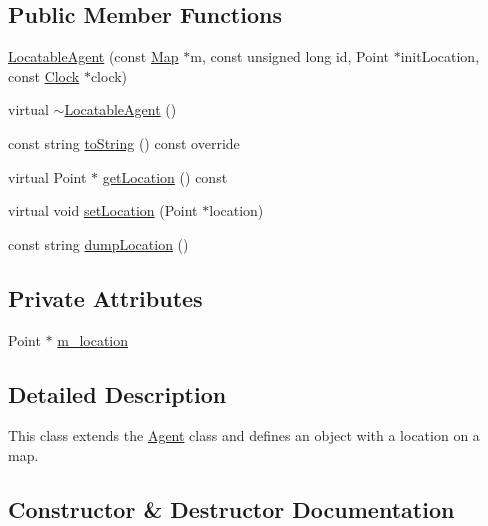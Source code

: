 \subsection*{Public Member Functions}
\begin{DoxyCompactItemize}
\item 
\hyperlink{class_locatable_agent_ab4939cf1ef1352acdac76736bfe47fc7}{Locatable\+Agent} (const \hyperlink{class_map}{Map} $\ast$m, const unsigned long id, Point $\ast$init\+Location, const \hyperlink{class_clock}{Clock} $\ast$clock)
\item 
virtual \hyperlink{class_locatable_agent_ad721398f0b4e841aad377cd91a7f5e3a}{$\sim$\+Locatable\+Agent} ()
\item 
const string \hyperlink{class_locatable_agent_a88674f4c8ab9b1b2f3986b226bf4244f}{to\+String} () const override
\item 
virtual Point $\ast$ \hyperlink{class_locatable_agent_ad779af171c67ce0d478fc79b904e2d90}{get\+Location} () const
\item 
virtual void \hyperlink{class_locatable_agent_a754b237c404b77714fedd397f214bc02}{set\+Location} (Point $\ast$location)
\item 
const string \hyperlink{class_locatable_agent_af9a6dbd25b47c23a71c95b205da3a28d}{dump\+Location} ()
\end{DoxyCompactItemize}
\subsection*{Private Attributes}
\begin{DoxyCompactItemize}
\item 
Point $\ast$ \hyperlink{class_locatable_agent_a2a76ba315733ab26f19229a71071704d}{m\+\_\+location}
\end{DoxyCompactItemize}


\subsection{Detailed Description}
This class extends the \hyperlink{class_agent}{Agent} class and defines an object with a location on a map. 

\subsection{Constructor \& Destructor Documentation}
\mbox{\label{class_locatable_agent_ab4939cf1ef1352acdac76736bfe47fc7}} 

